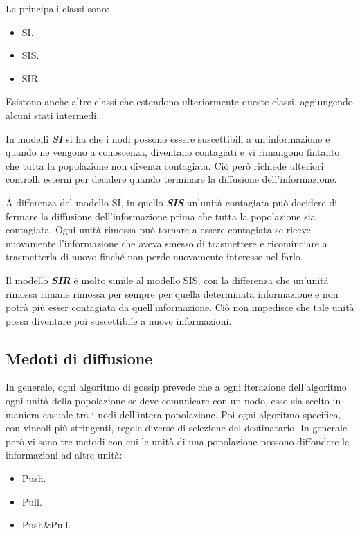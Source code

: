 Le principali classi sono:
\begin{itemize}
	\item \acf{SI}.
	\item \acf{SIS}.
	\item \acf{SIR}.
	
\end{itemize}
Esistono anche altre classi che estendono ulteriormente queste classi, aggiungendo alcuni stati intermedi.

In modelli \textbf{\textit{\acf{SI}}} si ha che i nodi possono essere suscettibili a un’informazione e quando ne vengono a conoscenza, diventano contagiati e vi rimangono fintanto che tutta la popolazione non diventa contagiata. Ciò però richiede ulteriori controlli esterni per decidere quando terminare la diffusione dell’informazione.

A differenza del modello \acs{SI}, in quello \textbf{\textit{\acf{SIS}}} un’unità contagiata può decidere di fermare la diffusione dell’informazione prima che tutta la popolazione sia contagiata. Ogni unità rimossa può tornare a essere contagiata se riceve nuovamente l’informazione che aveva smesso di trasmettere e ricominciare a trasmetterla di nuovo finché non perde nuovamente interesse nel farlo.

Il modello \textbf{\textit{\acf{SIR}}} è molto simile al modello \acs{SIS}, con la differenza che un’unità rimossa rimane rimossa per sempre per quella determinata informazione e non potrà più esser contagiata da quell’informazione. Ciò non impedisce che tale unità possa diventare poi suscettibile a nuove informazioni.

\subsection{Medoti di diffusione}
In generale, ogni algoritmo di gossip prevede che a ogni iterazione dell’algoritmo ogni unità della popolazione se deve comunicare con un nodo, esso sia scelto in maniera casuale tra i nodi dell’intera popolazione. Poi ogni algoritmo specifica, con vincoli più stringenti, regole diverse di selezione del destinatario. In generale però vi sono tre metodi con cui le unità di una popolazione possono diffondere le informazioni ad altre unità:
\begin{itemize}
	\item Push.
	\item Pull.
	\item Push\&Pull.
\end{itemize}
\bigskip

